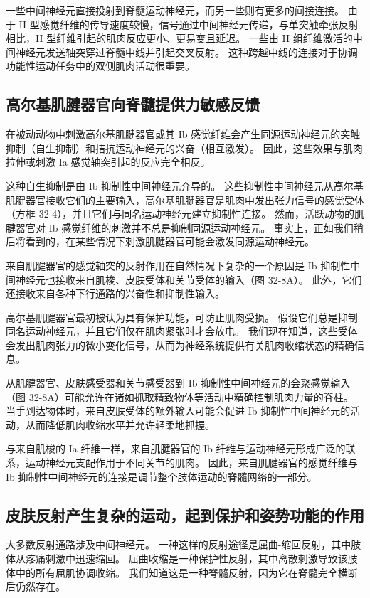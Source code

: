 一些中间神经元直接投射到脊髓运动神经元，而另一些则有更多的间接连接。 由于 II 型感觉纤维的传导速度较慢，信号通过中间神经元传递，与单突触牵张反射相比，II 型纤维引起的肌肉反应更小、更易变且延迟。 一些由 II 组纤维激活的中间神经元发送轴突穿过脊髓中线并引起交叉反射。 这种跨越中线的连接对于协调功能性运动任务中的双侧肌肉活动很重要。

\subsection{高尔基肌腱器官向脊髓提供力敏感反馈}
在被动动物中刺激高尔基肌腱器官或其 Ib 感觉纤维会产生同源运动神经元的突触抑制（自生抑制）和拮抗运动神经元的兴奋（相互激发）。 因此，这些效果与肌肉拉伸或刺激 Ia 感觉轴突引起的反应完全相反。

这种自生抑制是由 Ib 抑制性中间神经元介导的。 这些抑制性中间神经元从高尔基肌腱器官接收它们的主要输入，高尔基肌腱器官是肌肉中发出张力信号的感觉受体（方框 32-4），并且它们与同名运动神经元建立抑制性连接。 然而，活跃动物的肌腱器官对 Ib 感觉纤维的刺激并不总是抑制同源运动神经元。 事实上，正如我们稍后将看到的，在某些情况下刺激肌腱器官可能会激发同源运动神经元。

来自肌腱器官的感觉轴突的反射作用在自然情况下复杂的一个原因是 Ib 抑制性中间神经元也接收来自肌梭、皮肤受体和关节受体的输入（图 32-8A）。 此外，它们还接收来自各种下行通路的兴奋性和抑制性输入。

高尔基肌腱器官最初被认为具有保护功能，可防止肌肉受损。 假设它们总是抑制同名运动神经元，并且它们仅在肌肉紧张时才会放电。 我们现在知道，这些受体会发出肌肉张力的微小变化信号，从而为神经系统提供有关肌肉收缩状态的精确信息。

从肌腱器官、皮肤感受器和关节感受器到 Ib 抑制性中间神经元的会聚感觉输入（图 32-8A）可能允许在诸如抓取精致物体等活动中精确控制肌肉力量的脊柱。 当手到达物体时，来自皮肤受体的额外输入可能会促进 Ib 抑制性中间神经元的活动，从而降低肌肉收缩水平并允许轻柔地抓握。

与来自肌梭的 Ia 纤维一样，来自肌腱器官的 Ib 纤维与运动神经元形成广泛的联系，运动神经元支配作用于不同关节的肌肉。 因此，来自肌腱器官的感觉纤维与 Ib 抑制性中间神经元的连接是调节整个肢体运动的脊髓网络的一部分。

\subsection{皮肤反射产生复杂的运动，起到保护和姿势功能的作用}
大多数反射通路涉及中间神经元。 一种这样的反射途径是屈曲-缩回反射，其中肢体从疼痛刺激中迅速缩回。 屈曲收缩是一种保护性反射，其中离散刺激导致该肢体中的所有屈肌协调收缩。 我们知道这是一种脊髓反射，因为它在脊髓完全横断后仍然存在。

